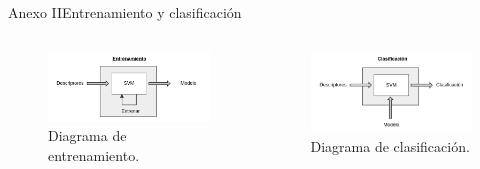 \documentclass{beamer}
\begin{document}
	\begin{frame}{Anexo II}{Entrenamiento y clasificación}
  		\begin{columns}[onlytextwidth]
  	 			\begin{column}{0.5\textwidth}
          \begin{figure}[bt]
   			    			\centering
           		    		\includegraphics[width=6cm]{imagenes/Entrenamiento.png}
         				\caption{Diagrama de entrenamiento.}
           			\end{figure}
				\end{column}
   				\begin{column}{0.5\textwidth}
          \begin{figure}[bt]
       					\centering
       		        		\includegraphics[width=6cm]{imagenes/Clasificacion.png}
       	  				\caption{Diagrama de clasificación.}
          \end{figure}
       			\end{column}
	  \end{columns}
    \end{frame}
\end{document}
